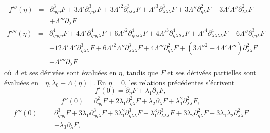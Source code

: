 \documentclass{article}
\newcommand{\nosymbol}{}
\begin{document}
\begin{eqnarray}
  \label{eq20211112173223} f''' (\eta) & = & \partial_{\eta  \eta
   \eta}^3 F + 3 \Lambda' \partial_{\eta  \eta
  \lambda}^3 {F + 3 \Lambda'}^2 \partial_{\eta  \lambda
  \lambda}^3 {F + \Lambda'}^3 \partial_{\lambda  \lambda
  \lambda}^3 F + 3 \Lambda'' \partial_{\eta  \lambda}^2 F + 3 \Lambda'
  \Lambda'' \partial_{\lambda  \lambda}^2 F \nonumber\\
  &  & \nosymbol + \Lambda''' \partial_{\lambda} F
\end{eqnarray}
\begin{eqnarray}
  f'''' (\eta) & = & \partial_{\eta  \eta  \eta
  \eta}^4 F + 4 \Lambda' \partial_{\eta  \eta  \eta
  \lambda}^4 {F + 6 \Lambda'}^2 \partial_{\eta  \eta  \lambda
   \lambda}^4 {F + 4 \Lambda'}^3 \partial_{\eta  \lambda
   \lambda  \lambda}^4 {F + \Lambda'}^4 \partial_{\lambda
   \lambda  \lambda  \lambda}^4 F + 6 \Lambda''
  \partial_{\eta  \eta  \lambda}^3 F \nonumber\\
  &  & + 12 \Lambda' \Lambda'' \partial_{\eta  \lambda
  \lambda}^3 {F + 6 \Lambda'}^2 \Lambda'' \partial_{\lambda  \lambda
   \lambda}^3 F + 4 \Lambda''' \partial_{\eta  \lambda}^2 F +
  \left( {3 \Lambda''}^2 + 4 \Lambda' \Lambda''' \right) \partial_{\lambda
   \lambda}^2 F \\
  &  & + \Lambda'''' \partial_{\lambda} F
\end{eqnarray}
où $\Lambda$ et ses dérivées sont évaluées en $\eta$,
tandis que $F$ et ses dérivées partielles sont évaluées en
$[\eta, \lambda_0 + \Lambda (\eta)]$. En $\eta = 0$, les relations
précédentes s'écrivent
\begin{equation}
  \label{eq20220107060454} f' (0) = \partial_{\eta} F + \lambda_1
  \partial_{\lambda} F,
\end{equation}
\begin{equation}
  \label{eq20220107124311} f'' (0) = \partial_{\eta  \eta}^2 F + 2
  \lambda_1 \partial_{\eta  \lambda}^2 F + \lambda_2
  \partial_{\lambda} F + \lambda_1^2 \partial_{\lambda  \lambda}^2 F,
\end{equation}
\begin{eqnarray}
  f''' (0) & = & \partial_{\eta  \eta  \eta}^3 F + 3 \lambda_1
  \partial_{\eta  \eta  \lambda}^3 F + 3 \lambda_1^2
  \partial_{\eta  \lambda  \lambda}^3 F + \lambda_1^3
  \partial_{\lambda  \lambda  \lambda}^3 F + 3 \lambda_2
  \partial_{\eta  \lambda}^2 F + 3 \lambda_1 \lambda_2
  \partial_{\lambda  \lambda}^2 F \nonumber\\
  &  & \nosymbol + \lambda_3 \partial_{\lambda} F,  \label{eq20220107060500}
\end{eqnarray}
\end{document}
